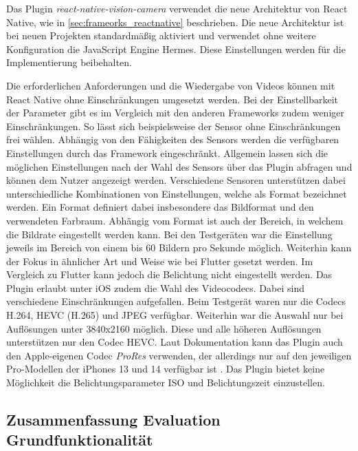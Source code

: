 Das Plugin \textit{react-native-vision-camera} verwendet die neue Architektur von React Native, wie in \autoref{sec:frameorks_reactnative} beschrieben.
Die neue Architektur ist bei neuen Projekten standardmäßig aktiviert und verwendet ohne weitere Konfiguration die JavaScript Engine Hermes.
Diese Einstellungen werden für die Implementierung beibehalten.

Die erforderlichen Anforderungen und die Wiedergabe von Videos können mit React Native ohne Einschränkungen umgesetzt werden.
Bei der Einstellbarkeit der Parameter gibt es im Vergleich mit den anderen Frameworks zudem weniger Einschränkungen.
So lässt sich beispielsweise der Sensor ohne Einschränkungen frei wählen.
Abhängig von den Fähigkeiten des Sensors werden die verfügbaren Einstellungen durch das Framework eingeschränkt.
Allgemein lassen sich die möglichen Einstellungen nach der Wahl des Sensors über das Plugin abfragen und können dem Nutzer angezeigt werden.
Verschiedene Sensoren unterstützen dabei unterschiedliche Kombinationen von Einstellungen, welche als Format bezeichnet werden.
Ein Format definiert dabei insbesondere das Bildformat und den verwendeten Farbraum.
Abhängig vom Format ist auch der Bereich, in welchem die Bildrate eingestellt werden kann.
Bei den Testgeräten war die Einstellung jeweils im Bereich von einem bis 60 Bildern pro Sekunde möglich.
Weiterhin kann der Fokus in ähnlicher Art und Weise wie bei Flutter gesetzt werden.
Im Vergleich zu Flutter kann jedoch die Belichtung nicht eingestellt werden.
Das Plugin erlaubt unter iOS zudem die Wahl des Videocodecs.
Dabei sind verschiedene Einschränkungen aufgefallen.
Beim Testgerät waren nur die Codecs H.264, \ac{HEVC} (H.265) und JPEG verfügbar.
Weiterhin war die Auswahl nur bei Auflösungen unter 3840x2160 möglich.
Diese und alle höheren Auflösungen unterstützen nur den Codec \ac{HEVC}.
Laut Dokumentation kann das Plugin auch den Apple-eigenen Codec \textit{ProRes} verwenden, der allerdings nur auf den jeweiligen Pro-Modellen der iPhones 13 und 14 verfügbar ist \cite{Prores_iPhone13}.
Das Plugin bietet keine Möglichkeit die Belichtungsparameter ISO und Belichtungszeit einzustellen.

\subsection{Zusammenfassung Evaluation Grundfunktionalität}

